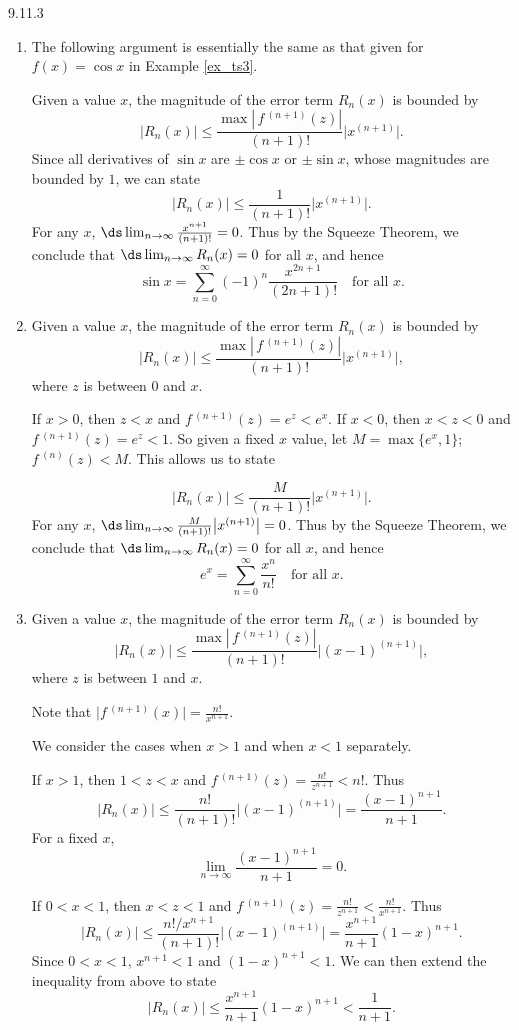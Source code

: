 \begin{Answer}{9.11.3}
\begin{enumerate}
\item
{The following argument is essentially the same as that given for $f(x) = \cos x$ in Example \ref{ex_ts3}.

Given a value $x$, the magnitude of the error term $R_n(x)$ is bounded by
$$ \big|R_n(x)\big| \leq \frac{\max\left|\,f\,^{(n+1)}(z)\right|}{(n+1)!}\big|x^{(n+1)}\big|.$$
Since all derivatives of $\sin x$ are $\pm \cos x$ or $\pm\sin x$, whose magnitudes are bounded by $1$, we can state
$$ \big|R_n(x)\big| \leq \frac{1}{(n+1)!}\big|x^{(n+1)}\big|.$$
For any $x$, $\ds\lim_{n\to\infty} \frac{x^{n+1}}{(n+1)!} = 0$. Thus by the Squeeze Theorem, we conclude that $\ds \lim_{n\to\infty} R_n(x) = 0$ for all $x$, and hence
$$\sin x = \sum_{n=0}^\infty (-1)^{n}\frac{x^{2n+1}}{(2n+1)!}\quad \text{for all $x$}.$$
}
\item
{Given a value $x$, the magnitude of the error term $R_n(x)$ is bounded by
$$ \big|R_n(x)\big| \leq \frac{\max\left|\,f\,^{(n+1)}(z)\right|}{(n+1)!}\big|x^{(n+1)}\big|,$$
where $z$ is between $0$ and $x$.

If $x>0$, then $z<x$ and $f\,^{(n+1)}(z) =e^z<e^x$. If $x<0$, then $x<z<0$ and $f\,^{(n+1)}(z) =e^z<1$. So given a fixed $x$ value, let $M = \max\{e^x,1\}$; $f\,^{(n)}(z)<M.$ This allows us to state

$$ \big|R_n(x)\big| \leq \frac{M}{(n+1)!}\big|x^{(n+1)}\big|.$$
For any $x$, $\ds\lim_{n\to\infty} \frac{M}{(n+1)!}\big|x^{(n+1)}\big|= 0$. Thus by the Squeeze Theorem, we conclude that $\ds \lim_{n\to\infty} R_n(x) = 0$ for all $x$, and hence
$$e^x = \sum_{n=0}^\infty \frac{x^{n}}{n!}\quad \text{for all $x$}.$$
}
\item
{Given a value $x$, the magnitude of the error term $R_n(x)$ is bounded by
$$ \big|R_n(x)\big| \leq \frac{\max\left|\,f\,^{(n+1)}(z)\right|}{(n+1)!}\big|(x-1)^{(n+1)}\big|,$$
where $z$ is between $1$ and $x$.

Note that $\big|f\,^{(n+1)}(x)\big| = \frac{n!}{x^{n+1}}$.

We consider the cases when $x>1$ and when $x<1$ separately.

If $x>1$, then $1<z<x$ and $f\,^{(n+1)}(z) =\frac{n!}{z^{n+1}}<n!$. Thus
$$ \big|R_n(x)\big| \leq \frac{n!}{(n+1)!}\big|(x-1)^{(n+1)}\big|= \frac{(x-1)^{n+1}}{n+1}.$$
For a fixed $x$,
$$\lim_{n\to\infty} \frac{(x-1)^{n+1}}{n+1}=0.$$


If $0<x<1$, then $x<z<1$ and $f\,^{(n+1)}(z) =\frac{n!}{z^{n+1}}<\frac{n!}{x^{n+1}}$. Thus
$$ \big|R_n(x)\big| \leq \frac{n!/x^{n+1}}{(n+1)!}\big|(x-1)^{(n+1)}\big| = \frac{x^{n+1}}{n+1}(1-x)^{n+1}.$$
Since $0<x<1$, $x^{n+1}<1$ and $(1-x)^{n+1}<1$. We can then extend the inequality from above to state
$$\big|R_n(x)\big| \leq \frac{x^{n+1}}{n+1}(1-x)^{n+1}<\frac1{n+1}.$$

}
\end{enumerate}
\end{Answer}
